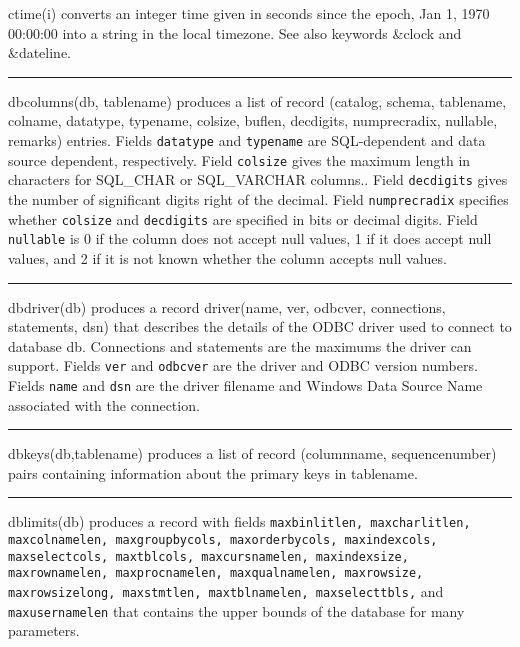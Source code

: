 \noindent
{}ctime(i) converts an integer time
given in seconds since the epoch, Jan 1, 1970 00:00:00 into a string in
the local timezone. See also keywords \&clock and \&dateline.

\bigskip\hrule\vspace{0.1cm}

\noindent
{}dbcolumns(db, tablename) produces a list of record
(catalog, schema, tablename, colname, datatype, typename, colsize,
buflen, decdigits, numprecradix, nullable, remarks) entries. Fields
\texttt{datatype} and \texttt{typename} are SQL-dependent and data
source dependent, respectively. Field \texttt{colsize} gives the
maximum length in characters for SQL\_CHAR or SQL\_VARCHAR columns..
Field \texttt{decdigits} gives the number of significant digits right
of the decimal. Field \texttt{numprecradix} specifies whether
\texttt{colsize} and \texttt{decdigits} are specified in bits or
decimal digits. Field \texttt{nullable} is 0 if the column does not
accept null values, 1 if it does accept null values, and 2 if it is not
known whether the column accepts null values.

\bigskip\hrule\vspace{0.1cm}

\noindent
{}dbdriver(db) produces a record driver(name, ver,
odbcver, connections, statements, dsn) that describes the details of
the ODBC driver used to connect to database db. Connections
and statements are the maximums the driver can support. Fields
\texttt{ver} and \texttt{odbcver} are the driver and ODBC version
numbers. Fields \texttt{name} and \texttt{dsn} are the driver filename
and Windows Data Source Name associated with the connection.

\bigskip\hrule\vspace{0.1cm}

\noindent
{}dbkeys(db,tablename) produces a list of record
(columnname, sequencenumber) pairs containing information about the
primary keys in tablename.

\bigskip\hrule\vspace{0.1cm}

\noindent
dblimits(db) produces a record with fields \texttt{maxbinlitlen,
maxcharlitlen, maxcolnamelen, maxgroupbycols, maxorderbycols,
maxindexcols, maxselectcols, maxtblcols, maxcursnamelen, maxindexsize,
maxrownamelen, maxprocnamelen, maxqualnamelen, maxrowsize,
maxrowsizelong, maxstmtlen, maxtblnamelen, maxselecttbls,} and\texttt{
maxusernamelen} that contains the upper bounds of the database for many
parameters.

